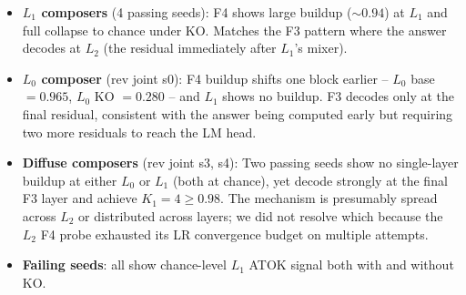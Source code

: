 \documentclass[11pt]{article}
\begin{document}
\begin{itemize}
\item \textbf{$L_1$ composers} (4 passing seeds): F4 shows large
      buildup ($\sim$$0.94$) at $L_1$ and full collapse to chance
      under KO. Matches the F3 pattern where the answer decodes at
      $L_2$ (the residual immediately after $L_1$'s mixer).
\item \textbf{$L_0$ composer} (rev joint s0): F4 buildup shifts one
      block earlier -- $L_0$ base $= 0.965$, $L_0$ KO $= 0.280$ --
      and $L_1$ shows no buildup. F3 decodes only at the final
      residual, consistent with the answer being computed early but
      requiring two more residuals to reach the LM head.
\item \textbf{Diffuse composers} (rev joint s3, s4): Two passing
      seeds show no single-layer buildup at either $L_0$ or $L_1$
      (both at chance), yet decode strongly at the final F3 layer
      and achieve $K_1{=}4 \geq 0.98$. The mechanism is presumably
      spread across $L_2$ or distributed across layers; we did not
      resolve which because the $L_2$ F4 probe exhausted its LR
      convergence budget on multiple attempts.
\item \textbf{Failing seeds}: all show chance-level $L_1$ ATOK
      signal both with and without KO.
\end{itemize}
\end{document}

